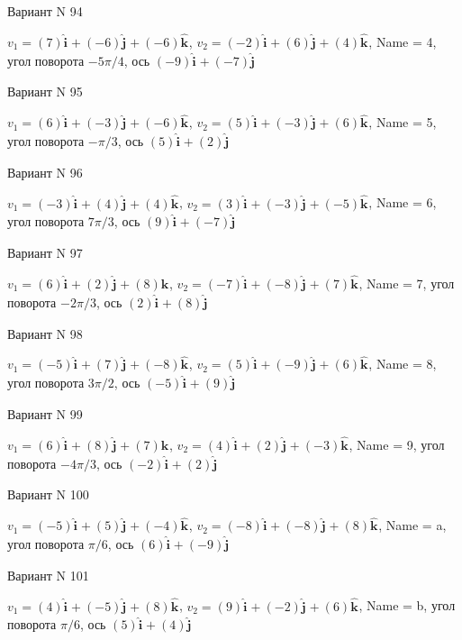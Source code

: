 \documentclass[11pt]{report}
\begin{document}
Вариант N 94

$v_1 = (7)\mathbf{\hat{i}_{}} + (-6)\mathbf{\hat{j}_{}} + (-6)\mathbf{\hat{k}_{}}$, $v_2 = (-2)\mathbf{\hat{i}_{}} + (6)\mathbf{\hat{j}_{}} + (4)\mathbf{\hat{k}_{}}$, Name = 4, угол поворота $- 5 \pi / 4$, ось $(-9)\mathbf{\hat{i}_{}} + (-7)\mathbf{\hat{j}_{}}$

Вариант N 95

$v_1 = (6)\mathbf{\hat{i}_{}} + (-3)\mathbf{\hat{j}_{}} + (-6)\mathbf{\hat{k}_{}}$, $v_2 = (5)\mathbf{\hat{i}_{}} + (-3)\mathbf{\hat{j}_{}} + (6)\mathbf{\hat{k}_{}}$, Name = 5, угол поворота $- \pi / 3$, ось $(5)\mathbf{\hat{i}_{}} + (2)\mathbf{\hat{j}_{}}$

Вариант N 96

$v_1 = (-3)\mathbf{\hat{i}_{}} + (4)\mathbf{\hat{j}_{}} + (4)\mathbf{\hat{k}_{}}$, $v_2 = (3)\mathbf{\hat{i}_{}} + (-3)\mathbf{\hat{j}_{}} + (-5)\mathbf{\hat{k}_{}}$, Name = 6, угол поворота $7 \pi / 3$, ось $(9)\mathbf{\hat{i}_{}} + (-7)\mathbf{\hat{j}_{}}$

Вариант N 97

$v_1 = (6)\mathbf{\hat{i}_{}} + (2)\mathbf{\hat{j}_{}} + (8)\mathbf{\hat{k}_{}}$, $v_2 = (-7)\mathbf{\hat{i}_{}} + (-8)\mathbf{\hat{j}_{}} + (7)\mathbf{\hat{k}_{}}$, Name = 7, угол поворота $- 2 \pi / 3$, ось $(2)\mathbf{\hat{i}_{}} + (8)\mathbf{\hat{j}_{}}$

Вариант N 98

$v_1 = (-5)\mathbf{\hat{i}_{}} + (7)\mathbf{\hat{j}_{}} + (-8)\mathbf{\hat{k}_{}}$, $v_2 = (5)\mathbf{\hat{i}_{}} + (-9)\mathbf{\hat{j}_{}} + (6)\mathbf{\hat{k}_{}}$, Name = 8, угол поворота $3 \pi / 2$, ось $(-5)\mathbf{\hat{i}_{}} + (9)\mathbf{\hat{j}_{}}$

Вариант N 99

$v_1 = (6)\mathbf{\hat{i}_{}} + (8)\mathbf{\hat{j}_{}} + (7)\mathbf{\hat{k}_{}}$, $v_2 = (4)\mathbf{\hat{i}_{}} + (2)\mathbf{\hat{j}_{}} + (-3)\mathbf{\hat{k}_{}}$, Name = 9, угол поворота $- 4 \pi / 3$, ось $(-2)\mathbf{\hat{i}_{}} + (2)\mathbf{\hat{j}_{}}$

Вариант N 100

$v_1 = (-5)\mathbf{\hat{i}_{}} + (5)\mathbf{\hat{j}_{}} + (-4)\mathbf{\hat{k}_{}}$, $v_2 = (-8)\mathbf{\hat{i}_{}} + (-8)\mathbf{\hat{j}_{}} + (8)\mathbf{\hat{k}_{}}$, Name = a, угол поворота $\pi / 6$, ось $(6)\mathbf{\hat{i}_{}} + (-9)\mathbf{\hat{j}_{}}$

Вариант N 101

$v_1 = (4)\mathbf{\hat{i}_{}} + (-5)\mathbf{\hat{j}_{}} + (8)\mathbf{\hat{k}_{}}$, $v_2 = (9)\mathbf{\hat{i}_{}} + (-2)\mathbf{\hat{j}_{}} + (6)\mathbf{\hat{k}_{}}$, Name = b, угол поворота $\pi / 6$, ось $(5)\mathbf{\hat{i}_{}} + (4)\mathbf{\hat{j}_{}}$
\end{document}
